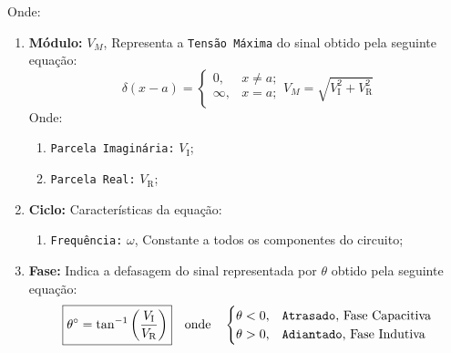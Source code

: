 \documentclass{article}
\begin{document}
        Onde:
            \begin{enumerate}
                \item \textbf{Módulo:} $V_{M}$, Representa a \texttt{Tensão Máxima} do sinal obtido pela seguinte equação:
                    \begin{equation*}
                        \boxed{
                            \delta(x-a) = 
                            \begin{cases}
                                0, & x \neq a;\\
                                \infty, & x = a;\\
                            \end{cases}
                            V_{M} = \sqrt{
                                V_{\text{I}}^{2} + V_{\text{R}}^{2}
                            }
                        }
                    \end{equation*}
                Onde:
                    \begin{enumerate}[noitemsep, rightmargin = \leftmargin]
                        \item \texttt{Parcela Imaginária:} $V_{\text{I}}$;

                        \item \texttt{Parcela Real:} $V_{\text{R}}$;
                    \end{enumerate}


                \item \textbf{Ciclo:} Características da equação:
                    \begin{enumerate}[noitemsep, rightmargin = \leftmargin]
                        \item \texttt{Frequência:} $\omega$, Constante a todos os componentes do circuito;
                    \end{enumerate}

                \item \textbf{Fase:} Indica a defasagem do sinal representada por $\theta$ obtido pela seguinte equação:
                    \begin{equation*}
                        \boxed{
                            \theta^{\circ} = \tan^{-1}
                            \left(
                                \frac{V_{\text{I}}}{V_{\text{R}}}
                            \right)
                        }
                        \quad
                        \text{onde}
                        \quad
                        \begin{cases}
                            \theta < 0, & \text{\texttt{Atrasado}, Fase Capacitiva}\\
                            \theta > 0, & \text{\texttt{Adiantado}, Fase Indutiva}
                        \end{cases}
                    \end{equation*}
            \end{enumerate}
\end{document}
